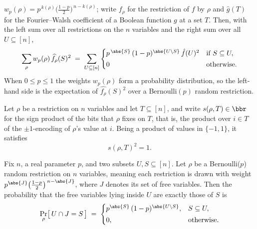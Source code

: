 \begin{theorem}
$w_p(\rho)=p^{\,k(\rho)}\bigl(\tfrac{1-p}{2}\bigr)^{\,n-k(\rho)}$; write $f_\rho$ for
the restriction of $f$ by $\rho$ and $\hat g(T)$ for the Fourier--Walsh coefficient of a
Boolean function $g$ at a set $T$. Then, with the left sum over all restrictions on the
$n$ variables and the right sum over all $U\subseteq[n]$,
\[
  \sum_{\rho} w_p(\rho)\,\widehat{f_\rho}(S)^2
  \;=\;
  \sum_{U\subseteq[n]}
  \begin{cases}
p^{\,\abs{S}}\,(1-p)^{\abs{U\setminus S}}\,\hat f(U)^2 & \text{if } S\subseteq U,\\[2pt]
    0 & \text{otherwise.}
  \end{cases}
\]
When $0\le p\le 1$ the weights $w_p(\rho)$ form a probability distribution, so the
left-hand side is the expectation of $\widehat{f_\rho}(S)^2$ over a Bernoulli$(p)$
random restriction.
\end{theorem}

\begin{lemma}
\label{RestrictionFourier.signProd_sq}
\leanok
{}
Let $\rho$ be a restriction on $n$ variables and let $T \subseteq [n]$, and write
$s(\rho, T) \in \bbr$ for the sign product of the bits that $\rho$ fixes on $T$, that
is, the product over $i \in T$ of the $\pm 1$-encoding of $\rho$'s value at $i$. Being a
product of values in $\{-1, 1\}$, it satisfies \[ s(\rho, T)^2 = 1. \]
\end{lemma}

\begin{theorem}
\label{RestrictionFourier.bernoulliRestrProb_inter_freeVars}
\leanok
{}
Fix $n$, a real parameter $p$, and two subsets $U, S \subseteq [n]$. Let $\rho$ be a
Bernoulli($p$) random restriction on $n$ variables, meaning each restriction is drawn
with weight $p^{\abs{J}}\bigl(\tfrac{1-p}{2}\bigr)^{\,n-\abs{J}}$, where $J$ denotes its
set of free variables. Then the probability that the free variables lying inside $U$ are
exactly those of $S$ is
\[
  \Pr_\rho\bigl[\,U \cap J = S\,\bigr] \;=\;
  \begin{cases}
    p^{\abs{S}}\,(1-p)^{\abs{U \setminus S}}, & S \subseteq U,\\[2pt]
    0, & \text{otherwise.}
  \end{cases}
\]
\end{theorem}

